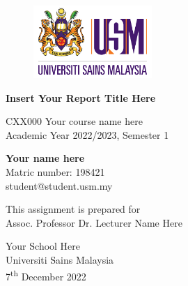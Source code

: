 \begin{titlepage}
   \begin{center}
       \vspace*{1cm}

       \begin{figure}[h]
           \centering
           \includegraphics[width=0.4\textwidth]{university}
       \end{figure}
       
       
       \Huge{\textbf{Insert Your Report Title Here}}

       \vspace{0.5cm}
        \large{CXX000 Your course name here \\
        Academic Year 2022/2023, Semester 1            }
       \vspace{1.5cm}

       \Large{\textbf{Your name here} \\
       \vspace{0.25cm}
       Matric number: 198421 \\ student@student.usm.my}

       \vfill
            
       This assignment is prepared for\\
       Assoc. Professor Dr. Lecturer Name Here
            
       \vspace{1cm}
       
       Your School Here\\
       Universiti Sains Malaysia\\
       7\textsuperscript{th} December 2022		%
            
   \end{center}
\end{titlepage}
